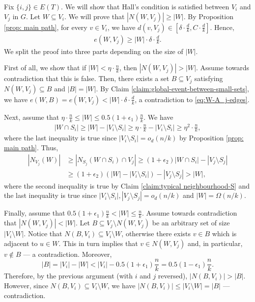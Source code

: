 \documentclass[notitlepage]{scrartcl}
\begin{document}
Fix $\{i,j\} \in E(T)$. We will show that Hall's condition is satisfied between $V_i$ and $V_j$ in $G$. Let $W \subseteq V_i$. We will prove that $|N(W, V_j)| \ge |W|$. By Proposition \ref{prop: main path}, for every $v \in V_i$, we have $d(v, V_j) \in \left[\delta \cdot \frac{d}{k}, C \cdot \frac{d}{k}\right]$. Hence, 
\begin{align}\label{eq:W-A_j-edges}
    e(W, V_j) \ge |W| \cdot \delta \cdot \frac{d}{k}.
\end{align}
We split the proof into three parts depending on the size of $|W|$.

First of all, we show that if $|W| < \eta \cdot \frac{n}{k}$, then $|N(W, V_j)| > |W|$. Assume towards contradiction that this is false. Then, there exists a set $B \subseteq V_j$ satisfying $N(W, V_j) \subseteq B$ and $|B| = |W|$. By Claim \ref{claim:global-event-between-small-sets}, we have $e(W, B) = e(W, V_j) < |W| \cdot \delta \cdot \frac{d}{k}$, a contradiction to \eqref{eq:W-A_j-edges}.

Next, assume that $\eta \cdot \frac{n}{k} \le |W| \le 0.5(1 + \epsilon_1) \frac{n}{k}$. We have
\begin{align*}        
    |W \cap S_i| \ge |W| - |V_i \setminus S_i| \ge \eta \cdot \frac{n}{k} - |V_i \setminus S_i| \ge \eta^2 \cdot \frac{n}{k},
\end{align*}
where the last inequality is true since $|V_i \setminus S_i| = o_d(n/k)$ by Proposition \ref{prop: main path}. Thus,
\begin{align*}
    |N_{V_j}(W)| &\ge |N_{S_j}(W \cap S_i) \cap V_j| \ge (1 + \epsilon_2) |W \cap S_i| - |V_j \setminus S_j| \\
    &\ge (1 + \epsilon_2)(|W| - |V_i \setminus S_i|) - |V_j \setminus S_j| > |W|,
\end{align*}
where the second inequality is true by Claim \ref{claim:typical neighbourhood-S} and the last inequality is true since $|V_i \setminus S_i|, |V_j \setminus S_j| = o_d(n/k)$ and $|W| = \Omega(n/k)$.

Finally, assume that $0.5(1 + \epsilon_1) \frac{n}{k} < |W| \le \frac{n}{k}$. Assume towards contradiction that $|N(W, V_j)| < |W|$. Let $B \subseteq V_j \setminus N(W, V_j)$ be an arbitrary set of size $|V_i \setminus W|$. Notice that $N(B, V_i) \subseteq V_i \setminus W$, otherwise there exists $v \in B$ which is adjacent to $u \in W$. This in turn implies that $v \in N(W, V_j)$ and, in particular, $v \notin B$ --- a contradiction. Moreover, 
\[
    |B| = |V_i| - |W| < |V_i| - 0.5(1 + \epsilon_1) \frac{n}{k} = 0.5(1-\epsilon_1) \frac{n}{k}.
\]
Therefore, by the previous argument (with $i$ and $j$ reversed), $|N(B, V_i)| > |B|$. However, since $N(B, V_i) \subseteq V_i \setminus W$, we have $|N(B, V_i)| \le |V_i \setminus W| = |B|$ --- contradiction.
\end{document}
